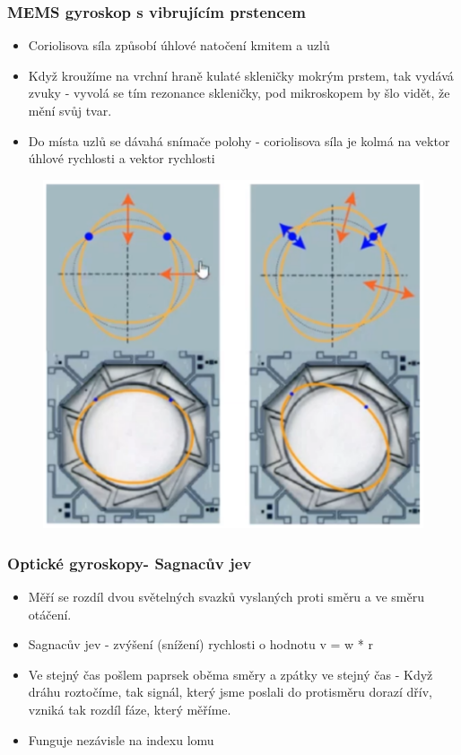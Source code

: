 \subsubsection*{MEMS gyroskop s vibrujícím prstencem}
\begin{itemize}
    \item Coriolisova síla způsobí úhlové natočení kmitem a uzlů
    \item Když kroužíme na vrchní hraně kulaté skleničky mokrým prstem, tak vydává zvuky - vyvolá se tím rezonance skleničky, pod mikroskopem by šlo vidět, že mění svůj tvar.
    \item Do místa uzlů se dávahá snímače polohy - coriolisova síla je kolmá na vektor úhlové rychlosti a vektor rychlosti
\end{itemize}

\begin{figure}[h]
    \centering
    \includegraphics[scale = 0.40]{img/VibrujiciPrstenec.png}
\end{figure}

\subsubsection*{Optické gyroskopy- Sagnacův jev}
\begin{itemize}
    \item Měří se rozdíl dvou světelných svazků vyslaných proti směru a ve směru otáčení.
    \item Sagnacův jev - zvýšení (snížení) rychlosti o hodnotu v = w * r
    \item Ve stejný čas pošlem paprsek oběma směry a zpátky ve stejný čas - Když dráhu roztočíme, tak signál, který jsme poslali do protisměru dorazí dřív, vzniká tak rozdíl fáze, který měříme.
    \item Funguje nezávisle na indexu lomu
\end{itemize}

